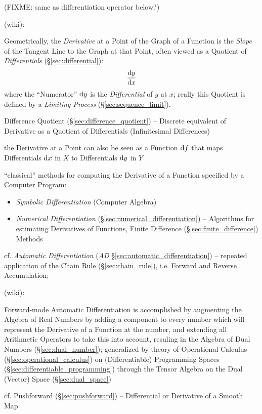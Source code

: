{(FIXME: same as differentiation operator below?)

(wiki):

Geometrically, the \emph{Derivative} at a Point of the Graph of a Function is
the \emph{Slope} of the Tangent Line to the Graph at that Point, often viewed as
a Quotient of \emph{Differentials} (\S\ref{sec:differential}):
\[
  \frac{\mathrm{d}y}{\mathrm{d}x}
\]
where the ``Numerator'' $\mathrm{d}y$ is the \emph{Differential} of $y$ at $x$;
really this Quotient is defined by a \emph{Limiting Process}
(\S\ref{sec:sequence_limit}). %

\fist Difference Quotient (\S\ref{sec:difference_quotient}) -- Discrete
equivalent of Derivative as a Quotient of Differentials (Infinitesimal
Differences)

the Derivative at a Point can also be seen as a Function $\mathrm{d}f$ that maps
Differentials $\mathrm{d}x$ in $X$ to Differentials $\mathrm{d}y$ in $Y$

``classical'' methods for computing the Derivative of a Function specified by a
Computer Program:
\begin{itemize}
\item \emph{Symbolic Differentiation} (Computer Algebra)
\item \emph{Numerical Differentiation} (\S\ref{sec:numerical_differentiation})
  -- Algorithms for estimating Derivatives of Functions, Finite Difference
  (\S\ref{sec:finite_difference}) Methods
\end{itemize}

\fist cf. \emph{Automatic Differentiation} (\emph{AD}
\S\ref{sec:automatic_differentiation}) -- repeated application of the Chain Rule
(\S\ref{sec:chain_rule}), i.e. Forward and Reverse Accumulation;

(wiki):

Forward-mode Automatic Differentiation is accomplished by augmenting the Algebra
of Real Numbers by adding a component to every number which will represent the
Derivative of a Function at the number, and extending all Arithmetic Operators
to take this into account, resuling in the Algebra of Dual Numbers
(\S\ref{sec:dual_number}); generalized by theory of
Operational Calculus (\S\ref{sec:operational_calculus}) on (Differentiable)
Programming Spaces (\S\ref{sec:differentiable_programming}) through the Tensor
Algebra on the Dual (Vector) Space (\S\ref{sec:dual_space})

\asterism

\fist cf. Pushforward (\S\ref{sec:pushforward}) -- Differential or Derivative of
a Smooth Map

}
